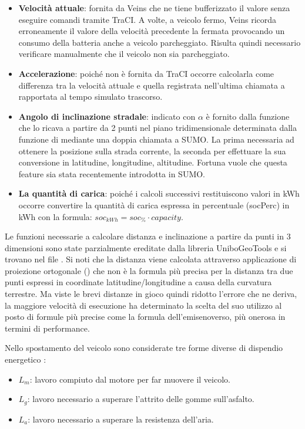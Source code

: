 \begin{itemize}
	\item \textbf{Velocità attuale}: fornita da Veins che ne tiene bufferizzato il valore senza eseguire comandi tramite TraCI. A volte, a veicolo fermo, Veins ricorda erroneamente il valore della velocità precedente la fermata provocando un consumo della batteria anche a veicolo parcheggiato. Risulta quindi necessario verificare manualmente che il veicolo non sia parcheggiato.
	\item \textbf{Accelerazione}: poiché non è fornita da TraCI occorre calcolarla come differenza tra la velocità attuale e quella registrata nell'ultima chiamata a  rapportata al tempo simulato trascorso.
	\item \textbf{Angolo di inclinazione stradale}: indicato con $\alpha$ è fornito dalla funzione  che lo ricava a partire da 2 punti nel piano tridimensionale determinata dalla funzione  di  mediante una doppia chiamata a SUMO. La prima necessaria ad ottenere la posizione sulla strada corrente, la seconda per effettuare la sua conversione in latitudine, longitudine, altitudine. Fortuna vuole che questa feature sia stata recentemente introdotta in SUMO.
	\item \textbf{La quantità di carica}: poiché i calcoli successivi restituiscono valori in kWh occorre convertire la quantità di carica espressa in percentuale (socPerc) in kWh con la formula: $soc_{kWh} = soc_{\%} \cdot capacity$.
\end{itemize}

Le funzioni necessarie a calcolare distanza e inclinazione a partire da punti in 3 dimensioni sono state parzialmente ereditate dalla libreria UniboGeoTools e si trovano nel file . Si noti che la distanza viene calcolata attraverso applicazione di proiezione ortogonale () che non è la formula più precisa per la distanza tra due punti espressi in coordinate latitudine/longitudine a causa della curvatura terrestre. Ma viste le brevi distanze in gioco quindi ridotto l'errore che ne deriva, la maggiore velocità di esecuzione ha determinato la scelta del suo utilizzo al posto di formule più precise come la formula dell'emisenoverso, più onerosa in termini di performance.

Nello spostamento del veicolo sono considerate tre forme diverse di dispendio energetico :

\begin{itemize}
	\item \textbf{$L_m$}: lavoro compiuto dal motore per far muovere il veicolo.
	\item \textbf{$L_g$}: lavoro necessario a superare l'attrito delle gomme sull'asfalto.
	\item \textbf{$L_a$}: lavoro necessario a superare la resistenza dell'aria.
\end{itemize}

